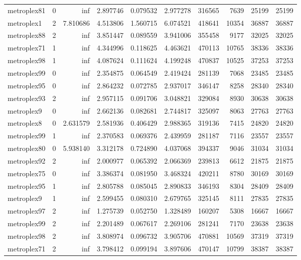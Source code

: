 \begin{longtable}{|l|r|r|r|r|r|r|r|r|r|}
metroplex81 & 0 & inf & 2.897746 & 0.079532 & 2.977278 & 316565 & 7639 & 25199 & 25199 \\
metroplex1 & 2 & 7.810686 & 4.513806 & 1.560715 & 6.074521 & 418641 & 10354 & 36887 & 36887 \\
metroplex88 & 2 & inf & 3.851447 & 0.089559 & 3.941006 & 355458 & 9177 & 32025 & 32025 \\
metroplex71 & 1 & inf & 4.344996 & 0.118625 & 4.463621 & 470113 & 10765 & 38336 & 38336 \\
metroplex98 & 1 & inf & 4.087624 & 0.111624 & 4.199248 & 470837 & 10525 & 37253 & 37253 \\
metroplex99 & 0 & inf & 2.354875 & 0.064549 & 2.419424 & 281139 & 7068 & 23485 & 23485 \\
metroplex95 & 0 & inf & 2.864232 & 0.072785 & 2.937017 & 346147 & 8258 & 28340 & 28340 \\
metroplex93 & 2 & inf & 2.957115 & 0.091706 & 3.048821 & 329084 & 8930 & 30638 & 30638 \\
metroplex9 & 0 & inf & 2.662136 & 0.082681 & 2.744817 & 325097 & 8063 & 27763 & 27763 \\
metroplex8 & 0 & 2.631579 & 2.581936 & 0.406429 & 2.988365 & 319136 & 7415 & 24820 & 24820 \\
metroplex99 & 1 & inf & 2.370583 & 0.069376 & 2.439959 & 281187 & 7116 & 23557 & 23557 \\
metroplex80 & 0 & 5.938140 & 3.312178 & 0.724890 & 4.037068 & 394337 & 9046 & 31034 & 31034 \\
metroplex92 & 2 & inf & 2.000977 & 0.065392 & 2.066369 & 239813 & 6612 & 21875 & 21875 \\
metroplex75 & 0 & inf & 3.386374 & 0.081950 & 3.468324 & 420211 & 8780 & 30169 & 30169 \\
metroplex95 & 1 & inf & 2.805788 & 0.085045 & 2.890833 & 346193 & 8304 & 28409 & 28409 \\
metroplex9 & 1 & inf & 2.599455 & 0.080310 & 2.679765 & 325145 & 8111 & 27835 & 27835 \\
metroplex97 & 2 & inf & 1.275739 & 0.052750 & 1.328489 & 160207 & 5308 & 16667 & 16667 \\
metroplex99 & 2 & inf & 2.201489 & 0.067617 & 2.269106 & 281241 & 7170 & 23638 & 23638 \\
metroplex98 & 2 & inf & 3.808974 & 0.096732 & 3.905706 & 470881 & 10569 & 37319 & 37319 \\
metroplex71 & 2 & inf & 3.798412 & 0.099194 & 3.897606 & 470147 & 10799 & 38387 & 38387 \\

\end{longtable}
